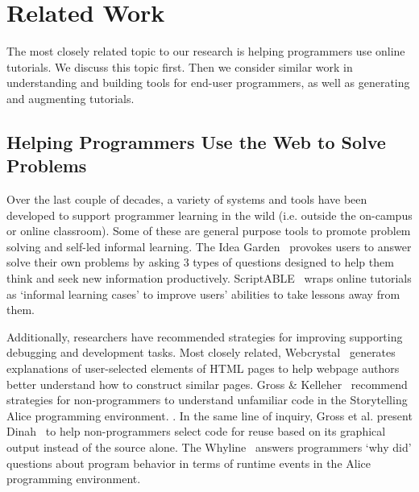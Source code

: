 \section{Related Work}


The most closely related topic to our research is helping programmers use online tutorials.
We discuss this topic first.
Then we consider similar work in understanding and building tools for end-user programmers,
as well as generating and augmenting tutorials.

\subsection{Helping Programmers Use the Web to Solve Problems}

Over the last couple of decades, a variety of systems and tools have been developed to support programmer learning in the wild
(i.e. outside the on-campus or online classroom).
Some of these are general purpose tools to promote problem solving and self-led informal learning.
The Idea Garden~\cite{cao_barriers_2012}\cite{cao_end-user_2013} provokes users to answer solve their own problems by asking 3 types of questions designed to help them think and seek new information productively.
ScriptABLE~\cite{dorn_scriptable_2011} wraps online tutorials as `informal learning cases' to improve users' abilities to take lessons away from them. 

Additionally, researchers have recommended strategies for improving supporting debugging and development tasks.
Most closely related, Webcrystal~\cite{chang_webcrystal_2012} generates explanations of user-selected elements of HTML pages to help webpage authors better understand how to construct similar pages.
Gross \& Kelleher~\cite{gross_non-programmers_2010} recommend strategies for non-programmers to understand unfamiliar code in the Storytelling Alice programming environment.
.
In the same line of inquiry, Gross et al. present Dinah~\cite{gross_dinah_2011} to help non-programmers select code for reuse based on its graphical output instead of the source alone.
The Whyline~\cite{ko_designing_2004} answers programmers `why did' questions about program behavior in terms of runtime events in the Alice programming environment.

